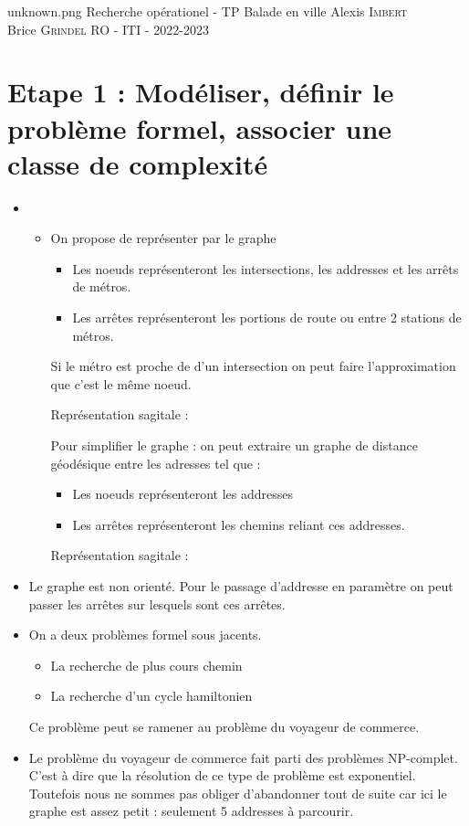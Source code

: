 \documentclass[11pt,a4paper]{article}
\begin{document}
\PageDeGarde	
{unknown.png} %
{Recherche opérationel - TP} %
{Balade en ville} %
{Alexis \textsc{Imbert}\\
 Brice \textsc{Grindel}} %
{RO - ITI - 2022-2023} %


 
\tableofcontents
\newpage
\section{Etape 1 : Modéliser, définir le problème formel, associer une classe de complexité}
\begin{itemize}
    \item 
    \begin{itemize}
        \item On propose de représenter par le graphe 
        \begin{itemize}
            \item Les noeuds représenteront les intersections, les addresses et les arrêts de métros.
            \item Les arrêtes représenteront les portions de route ou entre 2 stations de métros.
        \end{itemize}
        Si le métro est proche de d'un intersection on peut faire l'approximation que c'est le même noeud.

        Représentation sagitale :

        

        Pour simplifier le graphe : on peut extraire un graphe de distance géodésique entre les adresses tel que : 
        \begin{itemize}
            \item Les noeuds représenteront les addresses
            \item Les arrêtes représenteront les chemins reliant ces addresses.
        \end{itemize}
        Représentation sagitale :
        
    \end{itemize}
        

        \item Le graphe est non orienté. Pour le passage d'addresse en paramètre on peut passer les arrêtes sur lesquels sont ces arrêtes.

        
    \item On a deux problèmes formel sous jacents.
    \begin{itemize}
        \item La recherche de plus cours chemin
        \item La recherche d'un cycle hamiltonien
    \end{itemize}
    Ce problème peut se ramener au problème du voyageur de commerce.
    \item Le problème du voyageur de commerce fait parti des problèmes NP-complet. C'est à dire que la résolution de ce type de problème est exponentiel.
    Toutefois nous ne sommes pas obliger d'abandonner tout de suite car ici le graphe est assez petit : seulement 5 addresses à parcourir.


\end{itemize}
\end{document}
